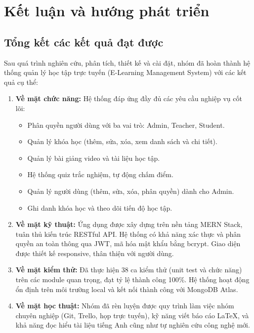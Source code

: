\chapter{Kết luận và hướng phát triển}

\section{Tổng kết các kết quả đạt được}
Sau quá trình nghiên cứu, phân tích, thiết kế và cài đặt, nhóm đã hoàn thành hệ thống quản lý học tập trực tuyến (E-Learning Management System) với các kết quả cụ thể:

\begin{enumerate}
    \item \textbf{Về mặt chức năng:} Hệ thống đáp ứng đầy đủ các yêu cầu nghiệp vụ cốt lõi:
    \begin{itemize}
        \item Phân quyền người dùng với ba vai trò: Admin, Teacher, Student.
        \item Quản lý khóa học (thêm, sửa, xóa, xem danh sách và chi tiết).
        \item Quản lý bài giảng video và tài liệu học tập.
        \item Hệ thống quiz trắc nghiệm, tự động chấm điểm.
        \item Quản lý người dùng (thêm, sửa, xóa, phân quyền) dành cho Admin.
        \item Ghi danh khóa học và theo dõi tiến độ học tập.
    \end{itemize}
    
    \item \textbf{Về mặt kỹ thuật:} Ứng dụng được xây dựng trên nền tảng MERN Stack, tuân thủ kiến trúc RESTful API. Hệ thống có khả năng xác thực và phân quyền an toàn thông qua JWT, mã hóa mật khẩu bằng bcrypt. Giao diện được thiết kế responsive, thân thiện với người dùng.
    
    \item \textbf{Về mặt kiểm thử:} Đã thực hiện 38 ca kiểm thử (unit test và chức năng) trên các module quan trọng, đạt tỷ lệ thành công 100\%. Hệ thống hoạt động ổn định trên môi trường local và kết nối thành công với MongoDB Atlas.
    
    \item \textbf{Về mặt học thuật:} Nhóm đã rèn luyện được quy trình làm việc nhóm chuyên nghiệp (Git, Trello, họp trực tuyến), kỹ năng viết báo cáo LaTeX, và khả năng đọc hiểu tài liệu tiếng Anh cũng như tự nghiên cứu công nghệ mới.
\end{enumerate}


